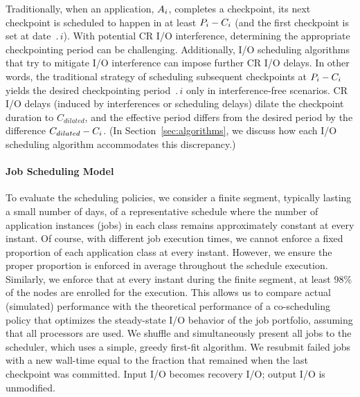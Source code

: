 Traditionally, when an application, $A_{i}$, completes a checkpoint, its next
checkpoint is scheduled to happen in at least $P_{i}-C_{i}$ (and the first
checkpoint is set at date $\period{i}$).  With potential CR I/O interference,
determining the appropriate checkpointing period can be challenging.
Additionally, I/O scheduling algorithms that try to mitigate I/O interference can
impose further CR I/O delays.  In other words, the traditional strategy of scheduling
subsequent checkpoints at $P_{i}-C_{i}$ yields the desired checkpointing
period $\period{i}$ only in interference-free scenarios. CR I/O delays (induced by
interferences or scheduling delays) dilate the checkpoint duration to $C_{dilated}$,
and the effective period differs from the desired period by the difference
$C_{dilated}-C_{i}$.  (In Section~\ref{sec:algorithms}, we discuss how each I/O
scheduling algorithm accommodates this discrepancy.)



\paragraph{Job Scheduling Model}
To evaluate the scheduling policies, we consider a finite segment, typically lasting
a small number of days, of a representative schedule where the number of application
instances (jobs) in each class remains approximately constant at every instant. Of
course, with different job execution times, we cannot enforce a fixed proportion of
each application class at every instant. However, we ensure the proper proportion is
enforced in average throughout the schedule execution. Similarly, we enforce that at
every instant during the finite segment, at least 98\% of the nodes are enrolled for
the execution. This allows us to compare actual (simulated) performance with the
theoretical performance of a co-scheduling policy that optimizes the steady-state I/O
behavior of the job portfolio, assuming that all processors are used. We shuffle and
simultaneously present all jobs to the scheduler, which uses a simple, greedy
first-fit algorithm.  We resubmit failed jobs with a new wall-time equal to the
fraction that remained when the last checkpoint was committed. Input I/O becomes
recovery I/O; output I/O is unmodified.

